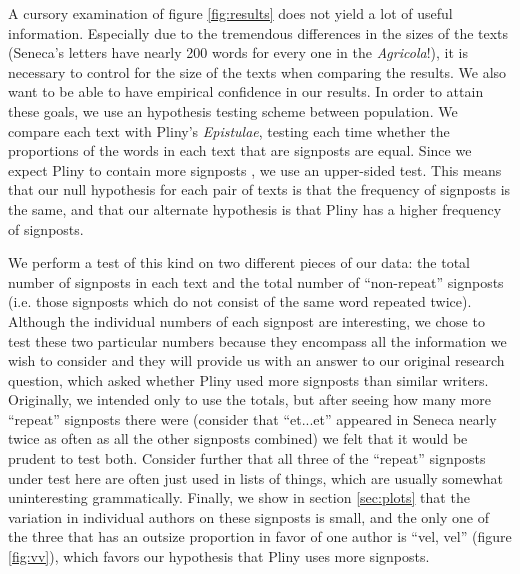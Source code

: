 A cursory examination of figure \ref{fig:results} does not yield a lot of useful information. Especially due to the tremendous differences in the sizes of the texts (Seneca's letters have nearly 200 words for every one in the \textit{Agricola}!), it is necessary to control for the size of the texts when comparing the results. We also want to be able to have empirical confidence in our results. In order to attain these goals, we use an hypothesis testing scheme between population. We compare each text with Pliny's \textit{Epistulae}, testing each time whether the proportions of the words in each text that are signposts are equal. Since we expect Pliny to contain more signposts \cite{Woodmanpm}, we use an upper-sided test. This means that our null hypothesis for each pair of texts is that the frequency of signposts is the same, and that our alternate hypothesis is that Pliny has a higher frequency of signposts.

We perform a test of this kind on two different pieces of our data: the total number of signposts in each text and the total number of ``non-repeat'' signposts (i.e. those signposts which do not consist of the same word repeated twice). Although the individual numbers of each signpost are interesting, we chose to test these two particular numbers because they encompass all the information we wish to consider and they will provide us with an answer to our original research question, which asked whether Pliny used more signposts than similar writers. Originally, we intended only to use the totals, but after seeing how many more ``repeat'' signposts there were (consider that ``et...et'' appeared in Seneca nearly twice as often as all the other signposts combined) we felt that it would be prudent to test both. Consider further that all three of the ``repeat'' signposts under test here are often just used in lists of things, which are usually somewhat uninteresting grammatically. Finally, we show in section \ref{sec:plots} that the variation in individual authors on these signposts is small, and the only one of the three that has an outsize proportion in favor of one author is ``vel, vel'' (figure \ref{fig:vv}), which favors our hypothesis that Pliny uses more signposts.

